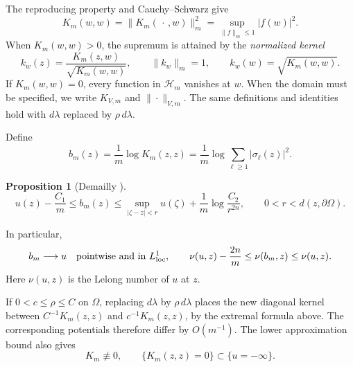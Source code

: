 \documentclass[reqno]{amsart}
\numberwithin{equation}{section}
\newtheorem{proposition}[theorem]{Proposition}
\theoremstyle{definition}
\begin{document}
The reproducing property and Cauchy--Schwarz give
\[
K_m(w,w)=\|K_m(\,\cdot\,,w)\|_m^2
=\sup_{\|f\|_m\le1}|f(w)|^2.
\]
When $K_m(w,w)>0$, the supremum is attained by the
\emph{normalized kernel}
\[
k_w(z)=\frac{K_m(z,w)}{\sqrt{K_m(w,w)}},
\qquad
\|k_w\|_m=1,\qquad
k_w(w)=\sqrt{K_m(w,w)}.
\]
If $K_m(w,w)=0$, every function in $\mathscr H_m$ vanishes
at $w$. When the domain must be specified, we write
$K_{V,m}$ and $\|\cdot\|_{V,m}$. The same definitions and
identities hold with $d\lambda$ replaced by
$\rho\,d\lambda$.

Define
\[
b_m(z)=\frac1m\log K_m(z,z)
=\frac1m\log\sum_{\ell\ge1}|\sigma_\ell(z)|^2.
\]
\begin{proposition}[{Demailly \cite[Proposition~3.1]{D92}}]
   \[
u(z)-\frac{C_1}{m}
\le b_m(z)
\le\sup_{|\zeta-z|<r}u(\zeta)
 +\frac1m\log\frac{C_2}{r^{2n}},
\qquad
0<r<d(z,\partial\Omega).
\]
\end{proposition}
In particular,
\[
b_m\longrightarrow u
\quad\text{pointwise and in }L^1_{\rm loc},\qquad
\nu(u,z)-\frac{2n}{m}\le\nu(b_m,z)\le\nu(u,z).
\]
Here $\nu(u,z)$ is the Lelong number of $u$ at $z$.

If $0<c\le\rho\le C$ on $\Omega$, replacing $d\lambda$
by $\rho\,d\lambda$ places the new diagonal kernel between
$C^{-1}K_m(z,z)$ and $c^{-1}K_m(z,z)$, by the extremal
formula above. The corresponding potentials therefore differ
by $O(m^{-1})$.
The lower approximation bound also gives
\[
K_m\not\equiv0,\qquad \{K_m(z,z)=0\}\subset\{u=-\infty\}.
\]
\end{document}
